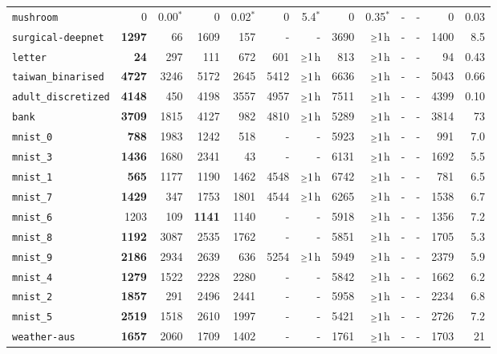 \begin{tabular}{lrrrrrrrrrrrr}
\texttt{mushroom} & 0 & 0.00$^*$ & 0 & 0.02$^*$ & 0 & 5.4$^*$ & 0 & 0.35$^*$ & - & - & 0 & 0.03\\
\texttt{surgical-deepnet} & \textbf{1297} & 66 & 1609 & 157 & - & - & 3690 & $\mathsmaller{\geq}1$h & - & - & 1400 & 8.5\\
\texttt{letter} & \textbf{24} & 297 & 111 & 672 & 601 & $\mathsmaller{\geq}1$h & 813 & $\mathsmaller{\geq}1$h & - & - & 94 & 0.43\\
\texttt{taiwan\_binarised} & \textbf{4727} & 3246 & 5172 & 2645 & 5412 & $\mathsmaller{\geq}1$h & 6636 & $\mathsmaller{\geq}1$h & - & - & 5043 & 0.66\\
\texttt{adult\_discretized} & \textbf{4148} & 450 & 4198 & 3557 & 4957 & $\mathsmaller{\geq}1$h & 7511 & $\mathsmaller{\geq}1$h & - & - & 4399 & 0.10\\
\texttt{bank} & \textbf{3709} & 1815 & 4127 & 982 & 4810 & $\mathsmaller{\geq}1$h & 5289 & $\mathsmaller{\geq}1$h & - & - & 3814 & 73\\
\texttt{mnist\_0} & \textbf{788} & 1983 & 1242 & 518 & - & - & 5923 & $\mathsmaller{\geq}1$h & - & - & 991 & 7.0\\
\texttt{mnist\_3} & \textbf{1436} & 1680 & 2341 & 43 & - & - & 6131 & $\mathsmaller{\geq}1$h & - & - & 1692 & 5.5\\
\texttt{mnist\_1} & \textbf{565} & 1177 & 1190 & 1462 & 4548 & $\mathsmaller{\geq}1$h & 6742 & $\mathsmaller{\geq}1$h & - & - & 781 & 6.5\\
\texttt{mnist\_7} & \textbf{1429} & 347 & 1753 & 1801 & 4544 & $\mathsmaller{\geq}1$h & 6265 & $\mathsmaller{\geq}1$h & - & - & 1538 & 6.7\\
\texttt{mnist\_6} & 1203 & 109 & \textbf{1141} & 1140 & - & - & 5918 & $\mathsmaller{\geq}1$h & - & - & 1356 & 7.2\\
\texttt{mnist\_8} & \textbf{1192} & 3087 & 2535 & 1762 & - & - & 5851 & $\mathsmaller{\geq}1$h & - & - & 1705 & 5.3\\
\texttt{mnist\_9} & \textbf{2186} & 2934 & 2639 & 636 & 5254 & $\mathsmaller{\geq}1$h & 5949 & $\mathsmaller{\geq}1$h & - & - & 2379 & 5.9\\
\texttt{mnist\_4} & \textbf{1279} & 1522 & 2228 & 2280 & - & - & 5842 & $\mathsmaller{\geq}1$h & - & - & 1662 & 6.2\\
\texttt{mnist\_2} & \textbf{1857} & 291 & 2496 & 2441 & - & - & 5958 & $\mathsmaller{\geq}1$h & - & - & 2234 & 6.8\\
\texttt{mnist\_5} & \textbf{2519} & 1518 & 2610 & 1997 & - & - & 5421 & $\mathsmaller{\geq}1$h & - & - & 2726 & 7.2\\
\texttt{weather-aus} & \textbf{1657} & 2060 & 1709 & 1402 & - & - & 1761 & $\mathsmaller{\geq}1$h & - & - & 1703 & 21\\
\bottomrule
\end{tabular}
